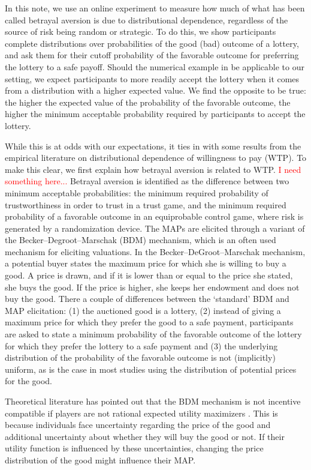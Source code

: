 In this note, we use an online experiment to measure how much of what has been called betrayal aversion is due to distributional dependence, regardless of the source of risk being random or strategic.
To do this, we show participants complete distributions over probabilities of the good (bad) outcome of a lottery, and ask them for their cutoff probability of the favorable outcome for preferring the lottery to a safe payoff.
Should the numerical example in \cite[Appendix A][]{Li2020a} be applicable to our setting, we expect participants to more readily accept the lottery when it comes from a distribution with a higher expected value.
We find the opposite to be true: the higher the expected value of the probability of the favorable outcome, the higher the minimum acceptable probability required by participants to accept the lottery.

While this is at odds with our expectations, it ties in with some results from the empirical literature on distributional dependence of willingness to pay (WTP).
To make this clear, we first explain how betrayal aversion is related to WTP.
\textcolor{red}{I need something here...}
Betrayal aversion is identified as the difference between two minimum acceptable probabilities: the minimum required probability of trustworthiness in order to trust in a trust game, and the minimum required probability of a favorable outcome in an equiprobable control game, where risk is generated by a randomization device.
The MAPs are elicited through a variant of the Becker--Degroot--Marschak (BDM) \citep{Becker1964} mechanism, which is an often used mechanism for eliciting valuations.
In the Becker--DeGroot--Marschak mechanism, a potential buyer states the maximum price for which she is willing to buy a good.
A price is drawn, and if it is lower than or equal to the price she stated, she buys the good.
If the price is higher, she keeps her endowment and does not buy the good.
There a couple of differences between the `standard' BDM and MAP elicitation: (1) the auctioned good is a lottery, (2) instead of giving a maximum price for which they prefer the good to a safe payment, participants are asked to state a minimum probability of the favorable outcome of the lottery for which they prefer the lottery to a safe payment and (3) the underlying distribution of the probability of the favorable outcome is not (implicitly) uniform, as is the case in most studies using the distribution of potential prices for the good.

Theoretical literature has pointed out that the BDM mechanism is not incentive compatible if players are not rational expected utility maximizers \citep{Karni1987,Horowitz2006}.
This is because individuals face uncertainty regarding the price of the good and additional uncertainty about whether they will buy the good or not.
If their utility function is influenced by these uncertainties, changing the price distribution of the good might influence their MAP.

